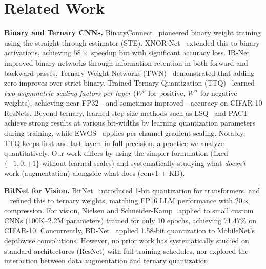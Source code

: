 \documentclass[10pt]{article}
\begin{document}

\section{Related Work}
\label{sec:related}

\textbf{Binary and Ternary CNNs.}
BinaryConnect~\cite{courbariaux2015binaryconnect} pioneered binary weight training using the straight-through estimator (STE). XNOR-Net~\cite{rastegari2016xnornet} extended this to binary activations, achieving $58\times$ speedup but with significant accuracy loss. IR-Net~\cite{qin2020irnet} improved binary networks through information retention in both forward and backward passes. Ternary Weight Networks (TWN)~\cite{li2016ternary} demonstrated that adding zero improves over strict binary. Trained Ternary Quantization (TTQ)~\cite{zhu2017ttq} learned \emph{two asymmetric scaling factors per layer} ($W^p$ for positive, $W^n$ for negative weights), achieving near-FP32---and sometimes improved---accuracy on CIFAR-10 ResNets. Beyond ternary, learned step-size methods such as LSQ~\cite{esser2020lsq} and PACT~\cite{choi2018pact} achieve strong results at various bit-widths by learning quantization parameters during training, while EWGS~\cite{lee2021ewgs} applies per-channel gradient scaling. Notably, TTQ keeps first and last layers in full precision, a practice we analyze quantitatively. Our work differs by using the simpler \bitnetb{} formulation (fixed $\{-1,0,+1\}$ without learned scales) and systematically studying what \emph{doesn't} work (augmentation) alongside what does (conv1 + KD).

\textbf{BitNet for Vision.}
BitNet~\cite{wang2023bitnet} introduced 1-bit quantization for transformers, and \bitnetb{}~\cite{ma2024bitnetb158} refined this to ternary weights, matching FP16 LLM performance with $20\times$ compression. For vision, Nielsen and Schneider-Kamp~\cite{nielsen2024bitnetreloaded} applied \bitnetb{} to small custom CNNs (100K--2.2M parameters) trained for only 10 epochs, achieving 71.47\% on CIFAR-10. Concurrently, BD-Net~\cite{kim2025bdnet} applied 1.58-bit quantization to MobileNet's depthwise convolutions. However, no prior work has systematically studied \bitnetb{} on standard architectures (ResNet) with full training schedules, nor explored the interaction between data augmentation and ternary quantization.
\end{document}
